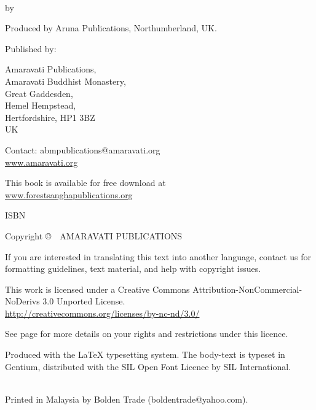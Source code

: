 {\small\setlength{\parskip}{0.8em}\setlength{\parindent}{0em}%
{\raggedright%

\thetitle\\
by \theauthor

Produced by Aruna Publications, Northumberland, UK.

Published by:

Amaravati Publications,\\
Amaravati Buddhist Monastery,\\
Great Gaddesden, \\
Hemel Hempstead, \\
Hertfordshire, HP1 3BZ\\
UK

Contact: abmpublications@amaravati.org\\
\href{http://amaravati.org}{www.amaravati.org}

This book is available for free download at\\
\href{http://forestsanghapublications.org/}{www.forestsanghapublications.org}

ISBN \theISBN

Copyright \copyright\ \the\year\ AMARAVATI PUBLICATIONS

\vfill

{\footnotesize
If you are interested in translating this text into another language, contact us for formatting guidelines, text material, and help with copyright issues.

This work is licensed under a Creative Commons Attribution-NonCommercial-NoDerivs 3.0 Unported License.\\
\href{http://creativecommons.org/licenses/by-nc-nd/3.0/}{http://creativecommons.org/licenses/by-nc-nd/3.0/}

See page \pageref{copyright-details} for more details on your rights and restrictions under this licence.

Produced with the {\selectfont\LaTeX} typesetting system. The body-text is typeset in Gentium, distributed with the SIL Open Font Licence by SIL International.

\theEditionInfo\\
Printed in Malaysia by Bolden Trade (boldentrade@yahoo.com).

}

}}

